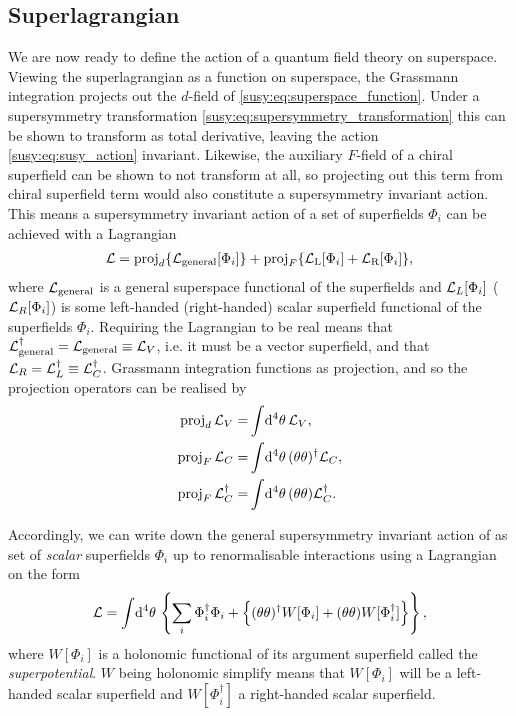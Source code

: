 \documentclass[../main.tex]{subfiles}
\begin{document}
\subsection{Superlagrangian}
We are now ready to define the action of a quantum field theory on superspace.
Viewing the superlagrangian as a function on superspace, the Grassmann integration projects out the \(d\)-field of \cref{susy:eq:superspace_function}.
Under a supersymmetry transformation \cref{susy:eq:supersymmetry_transformation} this can be shown to transform as total derivative, leaving the action \cref{susy:eq:susy_action} invariant.
Likewise, the auxiliary \(F\)-field of a chiral superfield can be shown to not transform at all, so projecting out this term from chiral superfield term would also constitute a supersymmetry invariant action.
This means a supersymmetry invariant action of a set of superfields \(\Phi_i\) can be achieved with a Lagrangian
\begin{align}
  \mathcal{L} = \operatorname{proj}_d \{\mathcal{L}_\text{general}[\Phi_i]\} + \operatorname{proj}_F \{\mathcal{L}_\text{L}[\Phi_i] + \mathcal{L}_\text{R}[\Phi_i]\},
\end{align}
where \(\mathcal{L}_\text{general}\) is a general superspace functional of the superfields and \(\mathcal{L}_L[\Phi_i]\) (\(\mathcal{L}_R[\Phi_i]\)) is some left-handed (right-handed) scalar superfield functional of the superfields \(\Phi_i\).
Requiring the Lagrangian to be real means that \(\mathcal{L}_\text{general}^\dagger = \mathcal{L}_\text{general} \equiv \mathcal{L}_V\), i.e. it must be a vector superfield, and that \(\mathcal{L}_R = \mathcal{L}_L^\dagger \equiv \mathcal{L}_C^\dagger\).
Grassmann integration functions as projection, and so the projection operators can be realised by
\begin{subequations}
  \begin{align}
    \operatorname{proj}_d \mathcal{L}_V =         & \int \!\mathrm{d}^4\theta\, \mathcal{L}_V,                        \\
    \operatorname{proj}_F \mathcal{L}_C =         & \int \!\mathrm{d}^4\theta\, (\theta\theta)^\dagger \mathcal{L}_C, \\
    \operatorname{proj}_F \mathcal{L}_C^\dagger = & \int \!\mathrm{d}^4\theta\, (\theta\theta) \mathcal{L}_C^\dagger.
  \end{align}
\end{subequations}

Accordingly, we can write down the general supersymmetry invariant action of as set of \emph{scalar} superfields \(\Phi_i\) up to renormalisable interactions using a Lagrangian on the form
\begin{align}
  \label{susy:eq:general_susy_lagrangian}
  \mathcal{L} = \int \!\mathrm{d}^4\theta\, \left\{\sum_i \Phi_i^\dagger \Phi_i + \left\{(\theta\theta)^\dagger W[\Phi_i] + (\theta\theta) W[\Phi_i^\dagger]\right\}\right\},
\end{align}
where \(W[\Phi_i]\) is a holonomic functional of its argument superfield called the \emph{superpotential}.
\(W\) being holonomic simplify means that \(W[\Phi_i]\) will be a left-handed scalar superfield and \(W[\Phi_i^\dagger]\) a right-handed scalar superfield.
\end{document}
